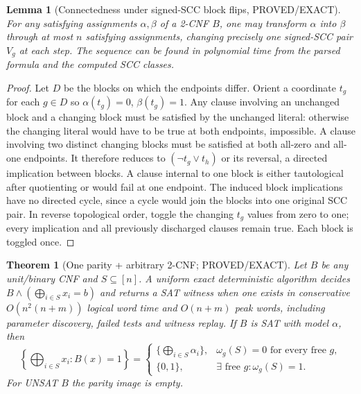 \documentclass[11pt]{article}
\newtheorem{theorem}{Theorem}
\newtheorem{lemma}{Lemma}
\begin{document}
\begin{lemma}[Connectedness under signed-SCC block flips, PROVED/EXACT]\label{lem:path}
For any satisfying assignments $\alpha,\beta$ of a 2-CNF $B$, one may transform $\alpha$ into $\beta$ through at most $n$ satisfying assignments, changing precisely one signed-SCC pair $V_g$ at each step. The sequence can be found in polynomial time from the parsed formula and the computed SCC classes.
\end{lemma}
\begin{proof}
Let $D$ be the blocks on which the endpoints differ. Orient a coordinate $t_g$ for each $g\in D$ so $\alpha(t_g)=0$, $\beta(t_g)=1$. Any clause involving an unchanged block and a changing block must be satisfied by the unchanged literal: otherwise the changing literal would have to be true at both endpoints, impossible. A clause involving two distinct changing blocks must be satisfied at both all-zero and all-one endpoints. It therefore reduces to $(\neg t_g\vee t_h)$ or its reversal, a directed implication between blocks. A clause internal to one block is either tautological after quotienting or would fail at one endpoint. The induced block implications have no directed cycle, since a cycle would join the blocks into one original SCC pair. In reverse topological order, toggle the changing $t_g$ values from zero to one; every implication and all previously discharged clauses remain true. Each block is toggled once.
\end{proof}
\begin{theorem}[One parity + arbitrary 2-CNF; PROVED/EXACT]\label{th:one}
Let $B$ be any unit/binary CNF and $S\subseteq[n]$. A uniform exact deterministic algorithm decides $B\wedge(\bigoplus_{i\in S}x_i=b)$ and returns a SAT witness when one exists in conservative $O(n^2(n+m))$ logical word time and $O(n+m)$ peak words, including parameter discovery, failed tests and witness replay. If $B$ is SAT with model $\alpha$, then
\[
\left\{\bigoplus_{i\in S}x_i:B(x)=1\right\}=
\begin{cases}
\{\bigoplus_{i\in S}\alpha_i\}, & \omega_g(S)=0\text{ for every free }g,\\
\{0,1\}, & \exists\text{ free }g:\omega_g(S)=1.
\end{cases}
\tag{1}
\]
For UNSAT $B$ the parity image is empty.
\end{theorem}
\end{document}

